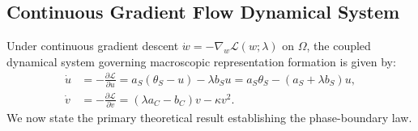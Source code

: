 \documentclass{article}
\theoremstyle{plain}
\theoremstyle{definition}
\begin{document}
\subsection{Continuous Gradient Flow Dynamical System}
Under continuous gradient descent $\dot{w} = -\nabla_w \mathcal{L}(w; \lambda)$ on $\Omega$, the coupled dynamical system governing macroscopic representation formation is given by:
\begin{align}
    \dot{u} &= -\frac{\partial \mathcal{L}}{\partial u} = a_S (\theta_S - u) - \lambda b_S u = a_S \theta_S - (a_S + \lambda b_S) u, \label{eq:ode_u} \\
    \dot{v} &= -\frac{\partial \mathcal{L}}{\partial v} = (\lambda a_C - b_C) v - \kappa v^2. \label{eq:ode_v}
\end{align}
We now state the primary theoretical result establishing the phase-boundary law.
\end{document}
